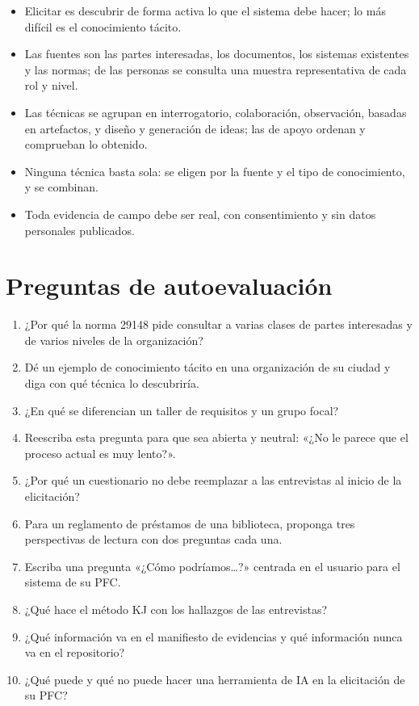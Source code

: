 \documentclass[11pt,a4paper,oneside]{report}
\begin{document}
\begin{itemize}[leftmargin=18pt,itemsep=2pt]
	\item Elicitar es descubrir de forma activa lo que el sistema debe hacer; lo más difícil es el conocimiento tácito.
	\item Las fuentes son las partes interesadas, los documentos, los sistemas existentes y las normas; de las personas se consulta una muestra representativa de cada rol y nivel.
	\item Las técnicas se agrupan en interrogatorio, colaboración, observación, basadas en artefactos, y diseño y generación de ideas; las de apoyo ordenan y comprueban lo obtenido.
	\item Ninguna técnica basta sola: se eligen por la fuente y el tipo de conocimiento, y se combinan.
	\item Toda evidencia de campo debe ser real, con consentimiento y sin datos personales publicados.
\end{itemize}

\section*{Preguntas de autoevaluación}

\begin{enumerate}[leftmargin=20pt,itemsep=3pt]
	\item ¿Por qué la norma 29148 pide consultar a varias clases de partes interesadas y de varios niveles de la organización?
	\item Dé un ejemplo de conocimiento tácito en una organización de su ciudad y diga con qué técnica lo descubriría.
	\item ¿En qué se diferencian un taller de requisitos y un grupo focal?
	\item Reescriba esta pregunta para que sea abierta y neutral: «¿No le parece que el proceso actual es muy lento?».
	\item ¿Por qué un cuestionario no debe reemplazar a las entrevistas al inicio de la elicitación?
	\item Para un reglamento de préstamos de una biblioteca, proponga tres perspectivas de lectura con dos preguntas cada una.
	\item Escriba una pregunta «¿Cómo podríamos\ldots?» centrada en el usuario para el sistema de su PFC.
	\item ¿Qué hace el método KJ con los hallazgos de las entrevistas?
	\item ¿Qué información va en el manifiesto de evidencias y qué información nunca va en el repositorio?
	\item ¿Qué puede y qué no puede hacer una herramienta de IA en la elicitación de su PFC?
\end{enumerate}
\end{document}

